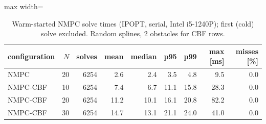 \begin{table}[!htbp]
\centering\small
\caption{Warm-started NMPC solve times (IPOPT, serial, Intel i5-1240P); first (cold) solve excluded. Random splines, 2 obstacles for CBF rows.}\label{tab:solvetime}
\begin{adjustbox}{max width=\linewidth}
\begin{tabular}{lrrrrrrrr}
\toprule
configuration & $N$ & solves & mean & median & p95 & p99 & max [ms] & misses [\%] \\
\midrule
NMPC & 20 & 6254 & 2.6 & 2.4 & 3.5 & 4.8 & 9.5 & 0.0 \\
NMPC-CBF & 10 & 6254 & 7.4 & 6.7 & 11.1 & 15.8 & 28.3 & 0.0 \\
NMPC-CBF & 20 & 6254 & 11.2 & 10.1 & 16.1 & 20.8 & 82.2 & 0.0 \\
NMPC-CBF & 30 & 6254 & 14.7 & 13.1 & 21.1 & 24.0 & 41.0 & 0.0 \\
\bottomrule
\end{tabular}
\end{adjustbox}
\end{table}
